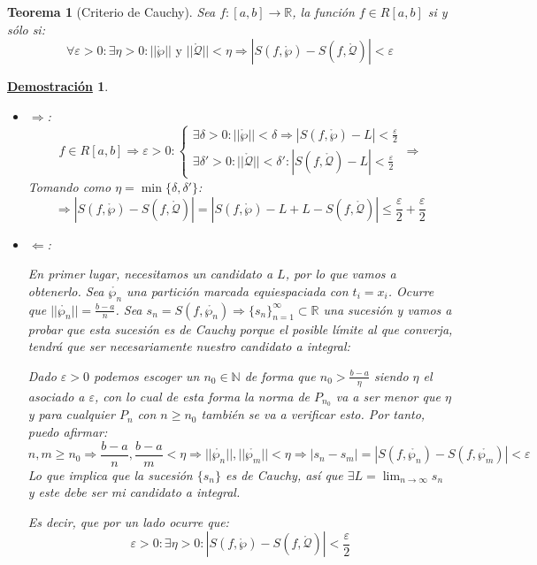 \documentclass[10pt,a4paper,openright]{book}
\theoremstyle{break}
\newtheorem{theo}{Teorema}[chapter]
\newtheorem*{demo}{\underline{Demostración}}
\begin{document}
\begin{theo}[Criterio de Cauchy]
Sea $f:[a,b]\rightarrow \mathbb R$, la función $f\in R[a,b]$ si y sólo si:
$$\forall \varepsilon > 0: \exists \eta > 0 : ||\mathring{\wp}|| \mbox{ y } ||\mathring{\mathcal{Q}}|| < \eta \Rightarrow \left| S(f,\mathring{\wp})- S(f, \mathring{\mathcal{Q}})\right| < \varepsilon $$
\end{theo}
\begin{demo}
\begin{itemize}
\item $\Rightarrow$:
$$f\in R[a,b]\Rightarrow \varepsilon >0 : \begin{cases}\exists \delta >0: ||\mathring{\wp}|| < \delta \Rightarrow |S(f,\mathring{\wp})-L| < \frac{\varepsilon}{2} \\ \exists \delta'>0: ||\mathring{\mathcal{Q}}||< \delta': |S(f, \mathring{\mathcal{Q}})-L|< \frac{\varepsilon}{2} \end{cases}\Rightarrow$$
Tomando como $\eta = \min\{\delta, \delta'\}$:
$$\Rightarrow |S(f,\mathring{\wp})-S(f,\mathring{\mathcal{Q}})|= |S(f,\mathring{\wp})-L+L-S(f,\mathring{\mathcal{Q}})| \leq \frac{\varepsilon}{2}+\frac{\varepsilon}{2}$$

\item $\Leftarrow$:

En primer lugar, necesitamos un candidato a $L$, por lo que vamos a obtenerlo. Sea $\mathring{\wp_n}$ una partición marcada equiespaciada con $t_i=x_i$. Ocurre que $||\mathring{\wp_n}||=\frac{b-a}{n}$. Sea $s_n=S(f,\mathring{\wp_n})\Rightarrow \{s_n\}_{n=1}^\infty \subset \mathbb R$ una sucesión y vamos a probar que esta sucesión es de Cauchy porque el posible límite al que converja, tendrá que ser necesariamente nuestro candidato a integral:

Dado $\varepsilon >0$ podemos escoger un $n_0\in \mathbb N$ de forma que $n_0> \frac{b-a}{\eta}$ siendo $\eta$ el asociado a $\varepsilon$, con lo cual de esta forma la norma de $P_{n_0}$ va a ser menor que $\eta$ y para cualquier $P_{n}$ con $n\geq n_0$ también se va a verificar esto. Por tanto, puedo afirmar:
$$n,m\geq n_0\Rightarrow \frac{b-a}{n}, \frac{b-a}{m}<\eta\Rightarrow ||\mathring{\wp_n}||,||\mathring{\wp_m}||<\eta\Rightarrow |s_n-s_m|=|S(f,\mathring{\wp_n})-S(f,\mathring{\wp_m})|<\varepsilon$$
Lo que implica que la sucesión $\{s_n\}$ es de Cauchy, así que $\exists L = \lim_{n\rightarrow \infty} s_n$ y este debe ser mi candidato a integral.

Es decir, que por un lado ocurre que:
$$\varepsilon > 0 : \exists \eta >0: |S(f,\mathring{\wp})-S(f, \mathring{\mathcal{Q}})|<\frac{\varepsilon}{2}$$


\end{itemize}
\end{demo}
\end{document}
